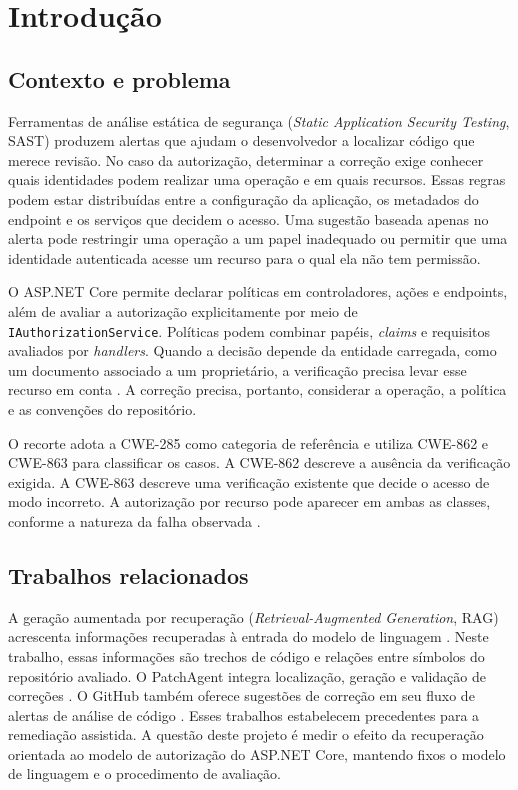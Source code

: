 \chapter{Introdução}
\label{cap:introducao}

\section{Contexto e problema}

Ferramentas de análise estática de segurança (\textit{Static Application Security Testing}, SAST) produzem alertas que ajudam o desenvolvedor a localizar código que merece revisão. No caso da autorização, determinar a correção exige conhecer quais identidades podem realizar uma operação e em quais recursos. Essas regras podem estar distribuídas entre a configuração da aplicação, os metadados do endpoint e os serviços que decidem o acesso. Uma sugestão baseada apenas no alerta pode restringir uma operação a um papel inadequado ou permitir que uma identidade autenticada acesse um recurso para o qual ela não tem permissão.

O ASP.NET Core permite declarar políticas em controladores, ações e endpoints, além de avaliar a autorização explicitamente por meio de \texttt{IAuthorizationService}. Políticas podem combinar papéis, \textit{claims} e requisitos avaliados por \textit{handlers}. Quando a decisão depende da entidade carregada, como um documento associado a um proprietário, a verificação precisa levar esse recurso em conta \cite{aspnetpolicies,aspnetresource}. A correção precisa, portanto, considerar a operação, a política e as convenções do repositório.

O recorte adota a CWE-285 como categoria de referência e utiliza CWE-862 e CWE-863 para classificar os casos. A CWE-862 descreve a ausência da verificação exigida. A CWE-863 descreve uma verificação existente que decide o acesso de modo incorreto. A autorização por recurso pode aparecer em ambas as classes, conforme a natureza da falha observada \cite{cwe285,cwe862,cwe863}.

\section{Trabalhos relacionados}

A geração aumentada por recuperação (\textit{Retrieval-Augmented Generation}, RAG) acrescenta informações recuperadas à entrada do modelo de linguagem \cite{lewis2020rag}. Neste trabalho, essas informações são trechos de código e relações entre símbolos do repositório avaliado. O PatchAgent integra localização, geração e validação de correções \cite{yu2025patchagent}. O GitHub também oferece sugestões de correção em seu fluxo de alertas de análise de código \cite{githubautofix}. Esses trabalhos estabelecem precedentes para a remediação assistida. A questão deste projeto é medir o efeito da recuperação orientada ao modelo de autorização do ASP.NET Core, mantendo fixos o modelo de linguagem e o procedimento de avaliação.

